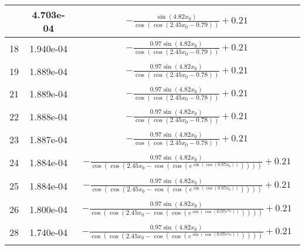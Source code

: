 \begin{center}
\begin{tabular}{|c|c|c|}
& 4.703e-04 & $\begin{aligned}- \frac{\sin{\left(4.82 x_{0} \right)}}{\cos{\left(\cos{\left(2.45 x_{0} - 0.79 \right)} \right)}} + 0.21\end{aligned}$\\ \hline18 & 1.940e-04 & $\begin{aligned}- \frac{0.97 \sin{\left(4.82 x_{0} \right)}}{\cos{\left(\cos{\left(2.45 x_{0} - 0.79 \right)} \right)}} + 0.21\end{aligned}$\\ \hline19 & 1.889e-04 & $\begin{aligned}- \frac{0.97 \sin{\left(4.82 x_{0} \right)}}{\cos{\left(\cos{\left(2.45 x_{0} - 0.78 \right)} \right)}} + 0.21\end{aligned}$\\ \hline21 & 1.889e-04 & $\begin{aligned}- \frac{0.97 \sin{\left(4.82 x_{0} \right)}}{\cos{\left(\cos{\left(2.45 x_{0} - 0.78 \right)} \right)}} + 0.21\end{aligned}$\\ \hline22 & 1.888e-04 & $\begin{aligned}- \frac{0.97 \sin{\left(4.82 x_{0} \right)}}{\cos{\left(\cos{\left(2.45 x_{0} - 0.78 \right)} \right)}} + 0.21\end{aligned}$\\ \hline23 & 1.887e-04 & $\begin{aligned}- \frac{0.97 \sin{\left(4.82 x_{0} \right)}}{\cos{\left(\cos{\left(2.45 x_{0} - 0.78 \right)} \right)}} + 0.21\end{aligned}$\\ \hline24 & 1.884e-04 & $\begin{aligned}- \frac{0.97 \sin{\left(4.82 x_{0} \right)}}{\cos{\left(\cos{\left(2.45 x_{0} - \cos{\left(\cos{\left(e^{\sin{\left(\cos{\left(0.07 x_{0} \right)} \right)}} \right)} \right)} \right)} \right)}} + 0.21\end{aligned}$\\ \hline25 & 1.884e-04 & $\begin{aligned}- \frac{0.97 \sin{\left(4.82 x_{0} \right)}}{\cos{\left(\cos{\left(2.45 x_{0} - \cos{\left(\cos{\left(e^{\sin{\left(\cos{\left(0.07 x_{0} \right)} \right)}} \right)} \right)} \right)} \right)}} + 0.21\end{aligned}$\\ \hline26 & 1.800e-04 & $\begin{aligned}- \frac{0.97 \sin{\left(4.82 x_{0} \right)}}{\cos{\left(\cos{\left(2.45 x_{0} - \cos{\left(\cos{\left(e^{\sin{\left(\cos{\left(0.07 e^{x_{0}} \right)} \right)}} \right)} \right)} \right)} \right)}} + 0.21\end{aligned}$\\ \hline28 & 1.740e-04 & $\begin{aligned}- \frac{0.97 \sin{\left(4.82 x_{0} \right)}}{\cos{\left(\cos{\left(2.45 x_{0} - \cos{\left(\cos{\left(e^{\sin{\left(\cos{\left(0.07 e^{x_{0}} \right)} \right)}} \right)} \right)} \right)} \right)}} + 0.21\end{aligned}$\\ \hline\end{tabular}
        \end{center}
        